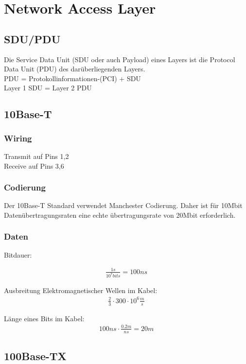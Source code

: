 \section{Network Access Layer}

\subsection{SDU/PDU}
Die Service Data Unit (SDU oder auch Payload) eines Layers ist die Protocol Data Unit (PDU) des darüberliegenden Layers. \\
PDU = Protokollinformationen-(PCI) + SDU\\
Layer 1 SDU = Layer 2 PDU
\subsection{10Base-T}

\subsubsection{Wiring}
Transmit auf Pins 1,2\\
Receive auf Pins 3,6

\subsubsection{Codierung}
Der 10Base-T Standard verwendet Manchester Codierung. Daher ist für 10Mbit Datenübertragungsraten eine echte übertragungsrate von 20Mbit erforderlich.
\subsubsection{Daten}

Bitdauer:

\begin{align}
\frac{1s}{10^{7}bits} = 100ns
\end{align}


Ausbreitung Elektromagnetischer Wellen im Kabel: 
\begin{align}
\frac{2}{3} \cdot 300\cdot 10^{6} \frac{m}{s}
\end{align}

Länge eines Bits im Kabel:
\begin{align}
100ns \cdot \frac{0.2m}{ns} = 20m
\end{align}

\subsection{100Base-TX}
